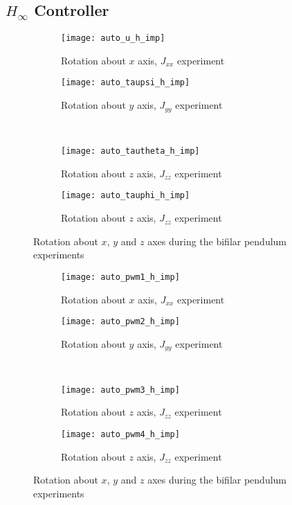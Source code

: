\begin{appendices}
\subsection*{$H_\infty$ Controller}

\begin{figure}[H]
\begin{subfigure}{.5\linewidth}
\centering
\texttt{[image: auto\_u\_h\_imp]}
\caption{Rotation about $x$ axis, $J_{xx}$ experiment}
\label{fig:auto_u_h_imp}
\end{subfigure}%
\begin{subfigure}{.5\linewidth}
\centering
\texttt{[image: auto\_taupsi\_h\_imp]}
\caption{Rotation about $y$ axis, $J_{yy}$ experiment}
\label{fig:auto_taupsi_h_imp}
\end{subfigure}\\[1ex]
\begin{subfigure}{0.5\linewidth}
\centering
\texttt{[image: auto\_tautheta\_h\_imp]}
\caption{Rotation about $z$ axis, $J_{zz}$ experiment}
\label{fig:auto_tautheta_h_imp}
\end{subfigure}
\begin{subfigure}{0.5\linewidth}
\centering
\texttt{[image: auto\_tauphi\_h\_imp]}
\caption{Rotation about $z$ axis, $J_{zz}$ experiment}
\label{fig:auto_tauphi_h_imp}
\end{subfigure}
\caption{Rotation about $x$, $y$ and $z$ axes during the bifilar pendulum experiments}
\label{fig:auto_control_h}
\end{figure}

\begin{figure}[H]
\begin{subfigure}{.5\linewidth}
\centering
\texttt{[image: auto\_pwm1\_h\_imp]}
\caption{Rotation about $x$ axis, $J_{xx}$ experiment}
\label{fig:auto_pwm_h_imp}
\end{subfigure}%
\begin{subfigure}{.5\linewidth}
\centering
\texttt{[image: auto\_pwm2\_h\_imp]}
\caption{Rotation about $y$ axis, $J_{yy}$ experiment}
\label{fig:auto_pwm2_h_imp}
\end{subfigure}\\[1ex]
\begin{subfigure}{0.5\linewidth}
\centering
\texttt{[image: auto\_pwm3\_h\_imp]}
\caption{Rotation about $z$ axis, $J_{zz}$ experiment}
\label{fig:auto_pwm3_h_imp}
\end{subfigure}
\begin{subfigure}{0.5\linewidth}
\centering
\texttt{[image: auto\_pwm4\_h\_imp]}
\caption{Rotation about $z$ axis, $J_{zz}$ experiment}
\label{fig:auto_pwm4_h_imp}
\end{subfigure}
\caption{Rotation about $x$, $y$ and $z$ axes during the bifilar pendulum experiments}
\label{fig:auto_pwm_h}
\end{figure}



\end{appendices}